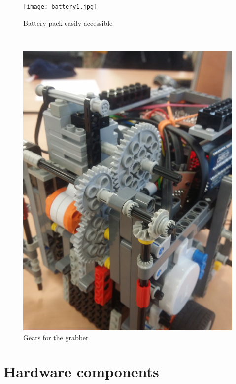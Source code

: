 \documentclass[a4paper,12pt]{article}
\begin{document}
\begin{figure}
	\centering
	\begin{minipage}[b]{.48\textwidth}
        \centering
		\texttt{[image: battery1.jpg]}
		\caption{Battery pack easily accessible}
		\label{fig:battery}
	\end{minipage}
	~
	\begin{minipage}[b]{.48\textwidth}
        \centering
		\includegraphics[scale=.065,angle=-90]{gears.jpg}
		\caption{Gears for the grabber}
		\label{fig:gears}
	\end{minipage}
	
\end{figure}


\section{Hardware components}
\end{document}
